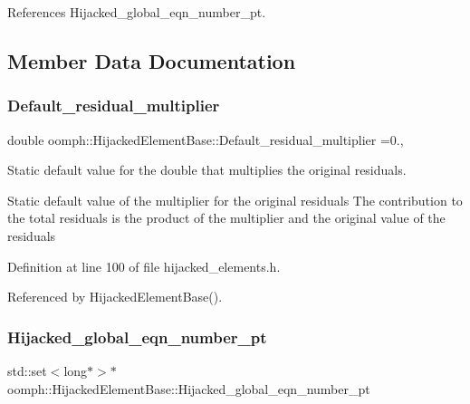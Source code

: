 References Hijacked\+\_\+global\+\_\+eqn\+\_\+number\+\_\+pt.



\subsection{Member Data Documentation}
\mbox{\label{classoomph_1_1HijackedElementBase_afd87cc7c33c2b846c5f7a373c352f13a}} 
\subsubsection{\texorpdfstring{Default\+\_\+residual\+\_\+multiplier}{Default\_residual\_multiplier}}
{\footnotesize\ttfamily double oomph\+::\+Hijacked\+Element\+Base\+::\+Default\+\_\+residual\+\_\+multiplier =0.\hspace{0.3cm}{\ttfamily [static]}, {\ttfamily [protected]}}



Static default value for the double that multiplies the original residuals. 

Static default value of the multiplier for the original residuals The contribution to the total residuals is the product of the multiplier and the original value of the residuals 

Definition at line 100 of file hijacked\+\_\+elements.\+h.



Referenced by Hijacked\+Element\+Base().

\mbox{\label{classoomph_1_1HijackedElementBase_a9c3a9a4e39ee5e3af0f5594c31f532c5}} 
\subsubsection{\texorpdfstring{Hijacked\+\_\+global\+\_\+eqn\+\_\+number\+\_\+pt}{Hijacked\_global\_eqn\_number\_pt}}
{\footnotesize\ttfamily std\+::set$<$long$\ast$$>$$\ast$ oomph\+::\+Hijacked\+Element\+Base\+::\+Hijacked\+\_\+global\+\_\+eqn\+\_\+number\+\_\+pt\hspace{0.3cm}{\ttfamily [protected]}}

